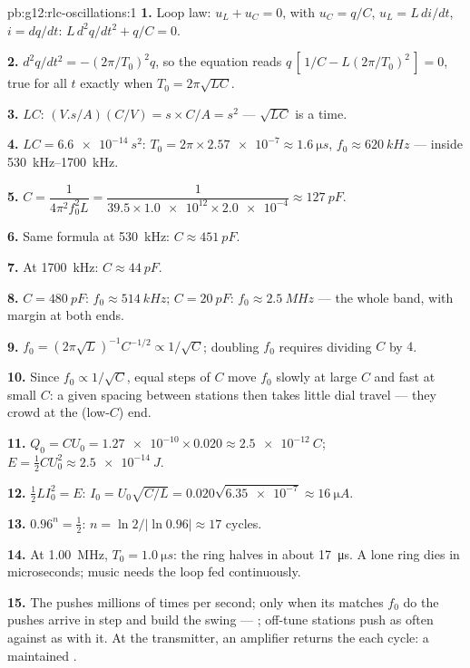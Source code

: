 \begin{solution}{pb:g12:rlc-oscillations:1}
\textbf{1.} Loop law: $u_L + u_C = 0$, with $u_C = q/C$,
$u_L = L\,di/dt$, $i = dq/dt$: $L\,d^2q/dt^2 + q/C = 0$.

\textbf{2.} $d^2q/dt^2 = -(2\pi/T_0)^2 q$, so the equation reads
$q\,[\,1/C - L(2\pi/T_0)^2\,] = 0$, true for all $t$ exactly when
$T_0 = 2\pi\sqrt{LC}$.

\textbf{3.} $LC$: $(\unit{V.s/A})(\unit{C/V}) = \unit{s} \times
\unit{C/A} = \unit{s^2}$ --- $\sqrt{LC}$ is a time.

\textbf{4.} $LC = \qty{6.6e-14}{s^2}$: $T_0 = 2\pi \times \num{2.57e-7}
\approx \qty{1.6}{\micro s}$, $f_0 \approx \qty{620}{kHz}$ --- inside
\qtyrange{530}{1700}{kHz}.

\textbf{5.} $C = \dfrac{1}{4\pi^2 f_0^2 L} = \dfrac{1}{39.5 \times
\num{1.0e12} \times \num{2.0e-4}} \approx \qty{127}{pF}$.

\textbf{6.} Same formula at \qty{530}{kHz}: $C \approx \qty{451}{pF}$.

\textbf{7.} At \qty{1700}{kHz}: $C \approx \qty{44}{pF}$.

\textbf{8.} $C = \qty{480}{pF}$: $f_0 \approx \qty{514}{kHz}$;
$C = \qty{20}{pF}$: $f_0 \approx \qty{2.5}{MHz}$ --- the whole band,
with margin at both ends.

\textbf{9.} $f_0 = (2\pi\sqrt{L})^{-1}C^{-1/2} \propto 1/\sqrt{C}$;
doubling $f_0$ requires dividing $C$ by $4$.

\textbf{10.} Since $f_0 \propto 1/\sqrt{C}$, equal steps of $C$ move
$f_0$ slowly at large $C$ and fast at small $C$: a given spacing
between stations then takes little dial travel --- they crowd at the
 (low-$C$) end.

\textbf{11.} $Q_0 = CU_0 = \num{1.27e-10} \times 0.020 \approx
\qty{2.5e-12}{C}$; $E = \tfrac12 CU_0^2 \approx \qty{2.5e-14}{J}$.

\textbf{12.} $\tfrac12 LI_0^2 = E$: $I_0 = U_0\sqrt{C/L} =
0.020\sqrt{\num{6.35e-7}} \approx \qty{16}{\micro A}$.

\textbf{13.} $0.96^n = \tfrac12$: $n = \ln 2/\lvert\ln 0.96\rvert
\approx 17$ cycles.

\textbf{14.} At \qty{1.00}{MHz}, $T_0 = \qty{1.0}{\micro s}$: the ring
halves in about \qty{17}{\micro s}. A lone ring dies in microseconds;
music needs the loop fed continuously.

\textbf{15.} The  pushes millions of times per second; only when
its  matches $f_0$ do the pushes arrive in step and build the
swing --- ; off-tune stations push as often against as with
it. At the transmitter, an amplifier returns the  
each cycle: a maintained .


\end{solution}

